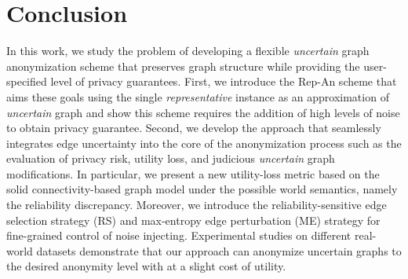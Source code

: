 \section{Conclusion}
In this work, we study the problem of developing a flexible \emph{uncertain} graph anonymization scheme that preserves graph structure while providing the user-specified level of privacy guarantees. First, we introduce the Rep-An scheme that aims these goals using the single \emph{representative} instance as an approximation of \emph{uncertain} graph and show this scheme requires the addition of high levels of noise to obtain privacy guarantee. 
Second, we develop the {\SysNameNS} approach that seamlessly integrates edge uncertainty into the core of the
anonymization process such as the evaluation of privacy risk, utility loss, and judicious \emph{uncertain} graph modifications. 
In particular, we present a new utility-loss metric based on the solid connectivity-based graph model under the possible world semantics, namely the reliability discrepancy. Moreover, we introduce the reliability-sensitive edge selection strategy (RS) and max-entropy edge perturbation (ME) strategy for fine-grained control of noise injecting. 
Experimental studies on different real-world datasets demonstrate that our approach can anonymize uncertain graphs to the desired anonymity level with at a slight cost of utility. 
